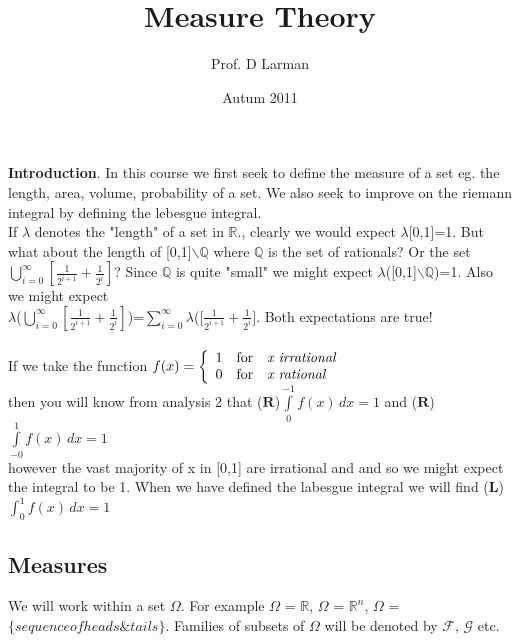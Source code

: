 \documentclass[12pt]{article}
\def\QQ{\mathbb{Q}}
\def\RR{\mathbb{R}}
\def\head#1{\medskip \noindent \textbf{#1}.}
\begin{document}
\title{Measure Theory}
\author{Prof. D Larman}
\date{Autum 2011}
\maketitle

\head{Introduction}  In this course we first seek to define the measure of a set eg. the length, area, volume, probability of a set. We also seek to improve on the riemann integral by defining the lebesgue integral.\\
 If $\lambda$ denotes the "length" of a set in  $\RR$., clearly we would expect $\lambda$[0,1]=1. But what about the length of [0,1]$\backslash\QQ$ where $\QQ$ is the set of rationals? Or the set $\bigcup_{i=0}^{\infty}[\frac{1}{2^{i+1}} +\frac{1}{2^i} ]$? Since $\QQ$ is quite "small" we might expect $\lambda$([0,1]$\backslash\QQ$)=1. Also we might expect\\  $\lambda$($\bigcup_{i=0}^{\infty}[\frac{1}{2^{i+1}} +\frac{1}{2^i} ]$)=$\sum_{i=0}^{\infty}\lambda$([$\frac{1}{2^{i+1}} +\frac{1}{2^i} ]$.  Both expectations are true!\\\\
If we take the function  $f(x) = \left\{ \begin{array}{rcl}
1 & \mbox{for} &
 \mbox{\emph{x  irrational}} \\ 0 & \mbox{for} & \mbox{\emph{x rational}} \\
\end{array}\right.$ \\then you will know from analysis 2 that ($\mathbf{R}$)$\int\limits_{0}^{-1}f(x)\,dx =1$ and ($\mathbf{R}$)$\int\limits_{-0}^{1}f(x)\,dx =1$
\\ however the vast majority of x in [0,1] are irrational and and so we might expect the integral to be 1. When we have defined the labesgue integral we will find ($\mathbf{L}$)$\int_{0}^{1}f(x)\,dx =1$

\begin{center}
\section{Measures}
\end{center}

We will work within a set $\Omega$. For example  $\Omega$ = $\RR$, $\Omega$ = $\RR^n$, $\Omega$ =$ \{sequence of heads \& tails\}$. Families of subsets of $\Omega$ will be denoted by $\mathcal{F}$,  $\mathcal{G}$ etc.\\
\end{document}
